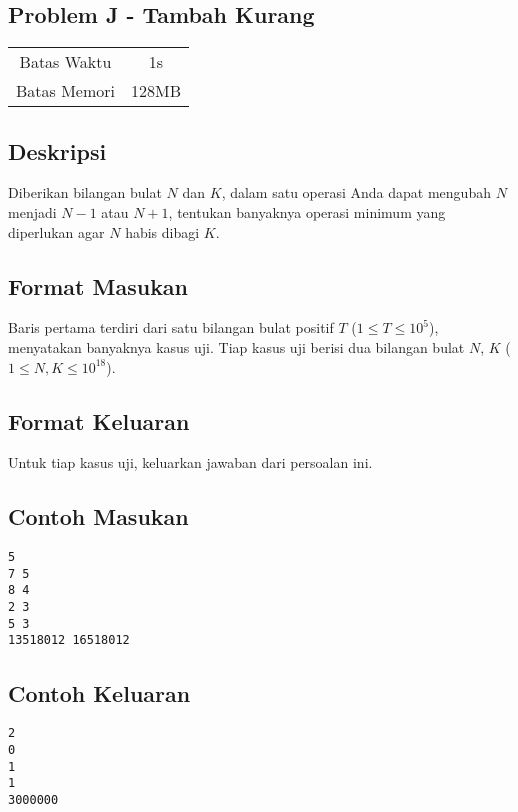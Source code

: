 \documentclass{article}
\begin{document}
\begin{center}
    \section*{Problem J - Tambah Kurang} %

    \begin{tabular}{ | c c | }
        \hline
        Batas Waktu  & 1s \\    %
        Batas Memori & 128MB \\  %
        \hline
    \end{tabular}
\end{center}

\subsection*{Deskripsi}

Diberikan bilangan bulat $N$ dan $K$, dalam satu operasi Anda dapat mengubah $N$ menjadi $N - 1$ atau $N + 1$, tentukan banyaknya operasi minimum yang diperlukan agar $N$ habis dibagi $K$.

\subsection*{Format Masukan}

Baris pertama terdiri dari satu bilangan bulat positif $T$ ($1 \leq T \leq 10^5$), menyatakan banyaknya kasus uji.
Tiap kasus uji berisi dua bilangan bulat $N$, $K$ ($1 \leq N, K \leq 10^{18}$).

\subsection*{Format Keluaran}

Untuk tiap kasus uji, keluarkan jawaban dari persoalan ini.

\begin{multicols}{2}
\subsection*{Contoh Masukan}
\begin{lstlisting}
5
7 5
8 4
2 3
5 3
13518012 16518012
\end{lstlisting}
\columnbreak
\subsection*{Contoh Keluaran}
\begin{lstlisting}
2
0
1
1
3000000
\end{lstlisting}
\vfill
\null
\end{multicols}


\pagebreak
\end{document}
